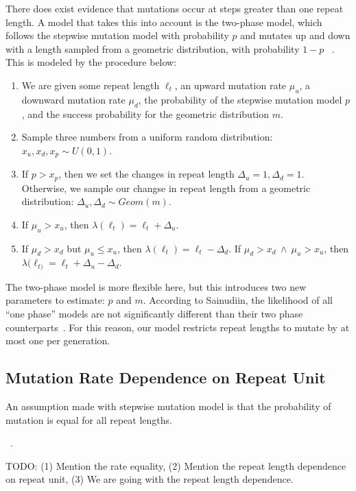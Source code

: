 There does exist evidence that mutations occur at steps greater than one repeat length.
A model that takes this into account is the two-phase model, which follows the stepwise mutation model with probability
$p$ and mutates up and down with a length sampled from a geometric distribution, with probability $1-p$
~\cite{dirienzoMutationalProcessesSimplesequence1994}.
This is modeled by the procedure below:
\begin{enumerate}
    \item We are given some repeat length $\ell_t$, an upward mutation rate $\mu_u$, a
        downward mutation rate $\mu_d$, the probability of the stepwise mutation model $p$, and the success probability
        for the geometric distribution $m$.
    \item Sample three numbers from a uniform random distribution: $x_u, x_d, x_p \sim U(0, 1)$.
    \item If $p > x_p$, then we set the changes in repeat length $\Delta_u = 1, \Delta_d = 1$.
        Otherwise, we sample our changse in repeat length from a geometric distribution:
        $\Delta_u, \Delta_d \sim \mathit{Geom}(m)$.
    \item If $\mu_u > x_u$, then $\lambda(\ell_{t}) = \ell_t + \Delta_u$.
    \item If $\mu_d > x_d$ but $\mu_u \leq x_u$, then $\lambda(\ell_{t}) = \ell_t - \Delta_d$.
        If $\mu_d > x_d \ \land \ \mu_u > x_u$, then $\lambda(\ell_{t)} = \ell_{t} + \Delta_u - \Delta_d$.
\end{enumerate}

The two-phase model is more flexible here, but this introduces two new parameters to estimate: $p$ and $m$.
According to Sainudiin, the likelihood of all ``one phase'' models are
not significantly different than their two phase counterparts~\cite{sainudiinMicrosatelliteMutationModels2004}.
For this reason, our model restricts repeat lengths to mutate by at most one per generation.

\subsection{Mutation Rate Dependence on Repeat Unit}\label{subsec:mrdonru}
An assumption made with stepwise mutation model is that the probability of mutation is equal for all repeat lengths.

~\cite{kornbergEnzymaticSynthesisDeoxyribonucleic1964}.


TODO: (1) Mention the rate equality, (2) Mention the repeat length dependence on repeat unit,
(3) We are going with the repeat length dependence.

